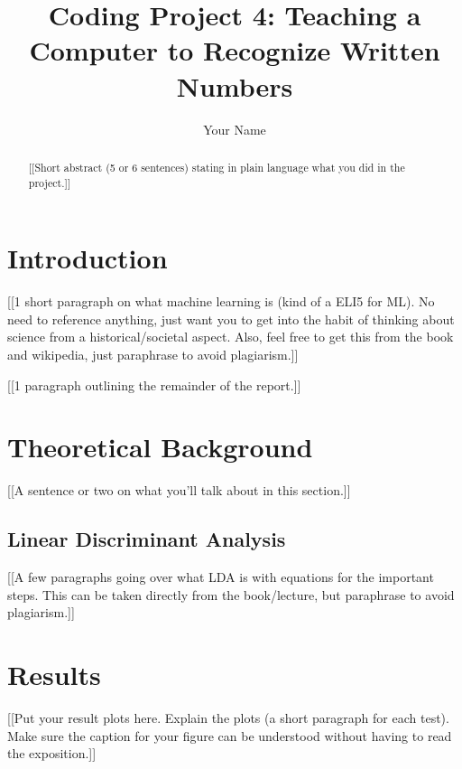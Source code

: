 \documentclass[12pt]{article}%
\begin{document}
\title{Coding Project 4:  Teaching a Computer to Recognize Written Numbers}

\author{Your Name}
\date{}

\maketitle


\begin{abstract}
{\color{red} [[Short abstract (5 or 6 sentences) stating in plain language what you did in the project.]]}
\end{abstract}


\section{Introduction}
\label{Sec: Intro}

{\color{red} [[1 short paragraph on what machine learning is (kind of a ELI5 for ML).  No need to reference anything, just want you to get into the habit of thinking about science from a historical/societal aspect.  Also, feel free to get this from the book and wikipedia, just paraphrase to avoid plagiarism.]]}

\bigskip
\bigskip

{\color{red} [[1 paragraph outlining the remainder of the report.]]}


\section{Theoretical Background}

{\color{red}[[A sentence or two on what you'll talk about in this section.]]}


\subsection{Linear Discriminant Analysis}

{\color{red}[[A few paragraphs going over what LDA is with equations for the important steps.  This can be taken directly from the book/lecture, but paraphrase to avoid plagiarism.]]}


\section{Results}

{\color{red}[[Put your result plots here.  Explain the plots (a short paragraph for each test).  Make sure the caption for your figure can be understood without having to read the exposition.]]}
\end{document}
